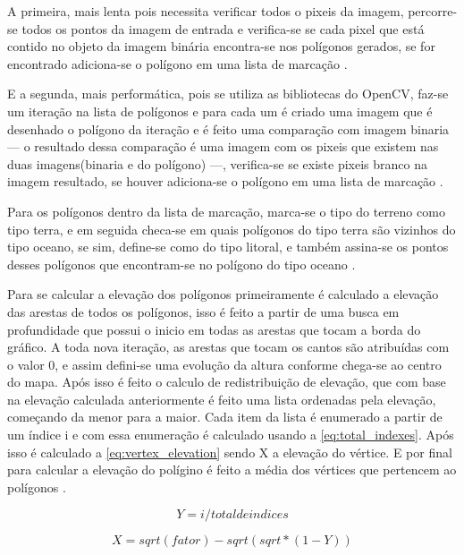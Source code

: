 A primeira, mais lenta pois necessita verificar todos o pixeis da imagem, percorre-se todos os pontos da imagem de entrada e verifica-se se cada pixel que está contido no objeto da imagem binária encontra-se nos polígonos gerados, se for encontrado adiciona-se o polígono em uma lista de marcação \cite{OpenCV}.

E a segunda, mais performática, pois se utiliza as bibliotecas do OpenCV, faz-se um iteração na lista de polígonos e para cada um é criado uma imagem que é desenhado o polígono da iteração e é feito uma comparação com imagem binaria — o resultado dessa comparação é uma imagem com os pixeis que existem nas duas imagens(binaria e do polígono) —, verifica-se se existe pixeis branco na imagem resultado, se houver adiciona-se o polígono em uma lista de marcação \cite{OpenCV}.

Para os polígonos dentro da lista de marcação, marca-se o tipo do terreno como tipo terra, e em seguida checa-se em quais polígonos do tipo terra são vizinhos do tipo oceano, se sim, define-se como do tipo litoral, e também assina-se os pontos desses polígonos que encontram-se no polígono do tipo oceano \cite{amitp2010,Embarcados}.

Para se calcular a elevação dos polígonos primeiramente é calculado a elevação das arestas de todos os polígonos, isso é feito a partir de uma busca em profundidade que possui o inicio em todas as arestas que tocam a borda do gráfico. A toda nova iteração, as arestas que tocam os cantos são atribuídas com o valor 0, e assim defini-se uma evolução da altura conforme chega-se ao centro do mapa.
Após isso é feito o calculo de redistribuição de elevação, que com base na elevação calculada anteriormente é feito uma lista ordenadas pela elevação, começando da menor para a maior. Cada item da lista é enumerado a partir de um índice i e com essa enumeração é calculado usando a \cref{eq:total_indexes}. Após isso é calculado a \cref{eq:vertex_elevation} sendo X a elevação do vértice.
E por final para calcular a elevação do polígino é feito a média dos vértices que pertencem ao polígonos \cite{amitp2010}.

\begin{equation}
	\label{eq:total_indexes}
	Y = i / total de indices
\end{equation}

\begin{equation}
	\label{eq:vertex_elevation}
	X = sqrt(fator) - sqrt(sqrt * (1 - Y))
\end{equation}

